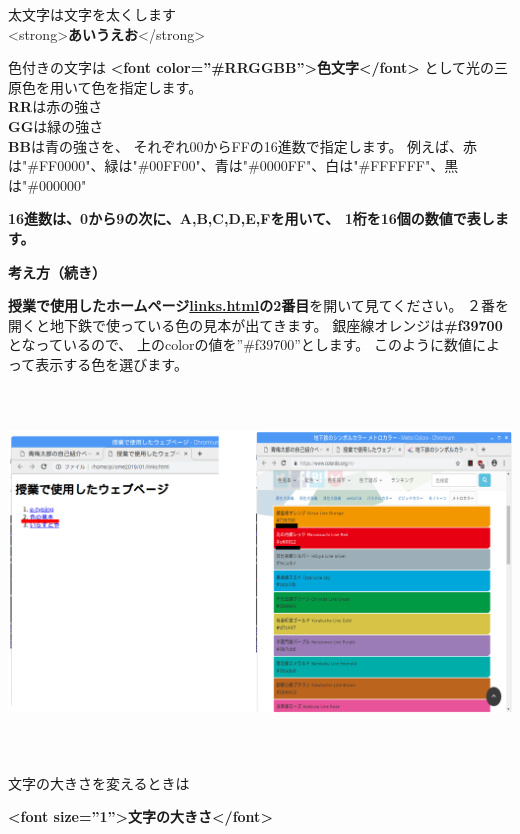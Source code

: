 \documentclass[a4paper,12pt]{jarticle}
\begin{document}
太文字は文字を太くします\\
{\textless}strong{\textgreater}\textbf{あいうえお}{\textless}/strong{\textgreater}


\bigskip
色付きの文字は
\textbf{{\textless}font color=”\#RRGGBB”{\textgreater}色文字{\textless}/font{\textgreater}}
として光の三原色を用いて色を指定します。\\
\textbf{RR}は赤の強さ\\
\textbf{GG}は緑の強さ\\
\textbf{BB}は青の強さを、
それぞれ00からFFの16進数で指定します。
例えば、赤は"\#FF0000"、緑は"\#00FF00"、青は"\#0000FF"、白は"\#FFFFFF"、黒は"\#000000"

\bigskip
\textbf{16進数は、0から9の次に、A,B,C,D,E,Fを用いて、
  1桁を16個の数値で表します。}

\bigskip



\clearpage
\textbf{考え方（続き）}



\textbf{授業で使用したホームページ\url{links.html}の2番目}を開いて見てください。
２番を開くと地下鉄で使っている色の見本が出てきます。
銀座線オレンジは\textbf{\#f39700}となっているので、
上のcolorの値を”\#f39700”とします。
このように数値によって表示する色を選びます。



\bigskip

\includegraphics[width=16.39cm,height=9.698cm]{textbook-img187.png}

文字の大きさを変えるときは

\textbf{{\textless}font size=”1”{\textgreater}文字の大きさ{\textless}/font{\textgreater}}
\end{document}
